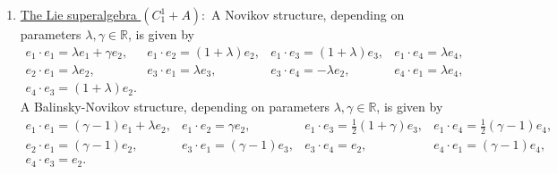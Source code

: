 \documentclass[12pt]{amsart}
\begin{document}
\begin{enumerate}
\[\begin{array}{l}
\end{array}
 \]
A Balinsky-Novikov structure, depending on parameters $\lambda, \gamma \in \mathbb R$, is given by
 \[
 \begin{array}{lll}
e_1 \cdot e_1= -\frac{2}{p} (p^2 \gamma - \lambda(2 p^2+1)) e_1 - 2p \lambda e_2, & e_1\cdot e_2= 2 p\lambda e_1-2 p \gamma e_2, \\[2mm] 
e_1\cdot e_3= \frac{1}{p}(-p^2\gamma +\lambda(p^2+1)) e_3+ \lambda e_4, &  
e_1\cdot e_4=\lambda e_3+p( -\gamma+\lambda)e_4,\\[2mm] 
e_2\cdot e_1= 2p \lambda e_1-2p \gamma e_2,& 
e_2\cdot e_2= 2 p \gamma e_1- \frac{2}{p}(-p^2 \lambda+(2p^2+1)\gamma) e_2, 
\\[2mm] 
e_2\cdot e_3=  p( -\gamma +\lambda)  e_3 + \gamma e_4, & 
e_2\cdot e_4= \gamma  e_3 + \frac{1}{p}((-1-p^2)\gamma+p^2\lambda) e_4, \\[2mm]  e_3\cdot e_1= \frac{2}{p}(-p^2\gamma +(p^2+1)\lambda) e_3 +2 \lambda e_4, & 
e_3 \cdot e_2=-2p ( \gamma - \lambda) e_3 + 2 \gamma e_4, \\[2mm] e_3 \cdot e_3=e_1, &
e_3 \cdot e_4=p e_1-p e_2, \\[2mm]
e_4\cdot e_1=2 \lambda e_3- 2p(\gamma - \lambda)e_4, & 
e_4\cdot e_2=2 \gamma e_3  - \frac{2}{p}((p^2+1)\gamma-p^2\lambda)) e_4, \\[2mm] e_4\cdot e_3=p e_1 - p e_2, & e_4 \cdot e_4=e_2.
 \end{array}
 \]
    \item \underline{The Lie superalgebra $(C_1^1+A):$} A Novikov structure, depending on parameters $\lambda, \gamma \in \mathbb R$, is given by
    \[
\begin{array}{llll}
e_1\cdot e_1= \lambda e_1 +\gamma e_2 , & e_1\cdot e_2= (1+\lambda) e_2, & e_1\cdot e_3= (1+\lambda) e_3, & e_1\cdot e_4=\lambda  e_4,\\[2mm] e_2\cdot e_1=\lambda e_2, & 
e_3\cdot e_1= \lambda e_3, & e_3 \cdot e_4=-\lambda e_2, & e_4\cdot e_1=\lambda e_4,\\[2mm]  
e_4 \cdot e_3=(1+\lambda) e_2.
\end{array}
 \]
A Balinsky-Novikov structure, depending on parameters $\lambda, \gamma \in \mathbb R$, is given by
 \[
 \begin{array}{llll}
e_1 \cdot e_1= (\gamma -1) e_1 + \lambda e_2, & e_1 \cdot e_2= \gamma e_2, & 
e_1 \cdot e_3=\frac{1}{2}(1+\gamma) e_3,&
e_1 \cdot e_4=\frac{1}{2}(\gamma-1)e_4,\\[2mm]
e_2\cdot e_1= (\gamma-1) e_2, & e_3\cdot e_1=(\gamma-1)e_3, & e_3\cdot e_4= e_2, & e_4\cdot e_1=(\gamma-1)e_4, \\[2mm] e_4\cdot e_3=e_2.

\end{array}\]
\end{enumerate}
\end{document}
